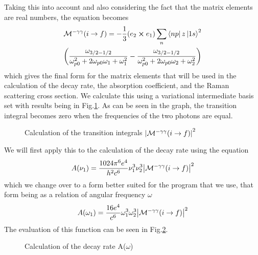 Taking this into account and also considering the fact that the matrix elements are real numbers, the equation becomes 
\begin{equation}
\begin{split}
\mathcal{M}^{-\gamma\gamma}(i\rightarrow f)=
    -\frac{1}{3}(e_2\cross e_1)
    \sum_{n}\bra{np}z\ket{1s}^2\\
    \bigg(
    \frac{\omega_{3/2-1/2}}{\omega_{p0}^2+2\omega_{p0}\omega_1+\omega_1^2}
    -\frac{\omega_{3/2-1/2}}{\omega_{p0}^2+2\omega_{p0}\omega_2+\omega_2^2}
    \bigg)
    \end{split}
\end{equation}
which gives the final form for the matrix elements that will be used in the calculation of the decay rate, the absorption coefficient, and the Raman scattering cross section. We calculate this using a variational intermediate basis set with results being in Fig.\ref{fig:Calculation of the Transition Integrals}. As can be seen in the graph, the transition integral becomes zero when the frequencies of the two photons are equal.
\begin{figure}
    \centering
    \caption{Calculation of the transition integrals $\abs{\mathcal{M}^{-\gamma\gamma}(i\rightarrow f)}^2$}
    \label{fig:Calculation of the Transition Integrals}
\end{figure}
We will first apply this to the calculation of the decay rate using the equation \cite{dalgarnohelium}
\begin{equation}
    A(\nu_1)=\frac{1024\pi^6e^4}{h^2c^6}\nu_1^3\nu_2^3\abs{\mathcal{M}^{-\gamma\gamma}(i\rightarrow f)}^2
\end{equation}
which we change over to a form better suited for the program that we use, that form being as a relation of angular frequency $\omega$
\begin{equation}
     A(\omega_1)=\frac{16e^4}{c^6}\omega_1^3\omega_2^3\abs{\mathcal{M}^{-\gamma\gamma}(i\rightarrow f)}^2
\end{equation}
The evaluation of this function can be seen in Fig.\ref{fig:Calculation of the Decay Rate}.
\begin{figure}
    \centering
    \caption{Calculation of the decay rate A($\omega$)}
    \label{fig:Calculation of the Decay Rate}
\end{figure}
